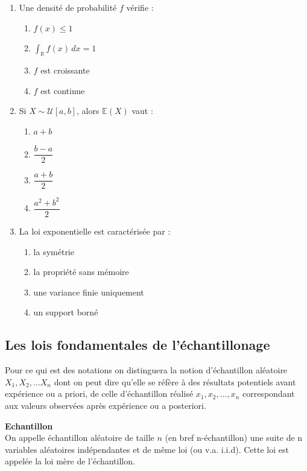 \documentclass[../PolyS4.tex]{subfiles}
\begin{document}
\begin{enumerate}
\item Une densité de probabilité $f$ vérifie :
\begin{enumerate}
\item $f(x)\le 1$
\item $\int_{\mathbb R}f(x)\,dx=1$
\item $f$ est croissante
\item $f$ est continue
\end{enumerate}

\newpage 

\item Si $X\sim\mathcal U[a,b]$, alors $\mathbb E(X)$ vaut :
\begin{enumerate}
\item $a+b$
\item $\dfrac{b-a}{2}$
\item $\dfrac{a+b}{2}$
\item $\dfrac{a^2+b^2}{2}$
\end{enumerate}

\item La loi exponentielle est caractérisée par :
\begin{enumerate}
\item la symétrie
\item la propriété sans mémoire
\item une variance finie uniquement
\item un support borné
\end{enumerate}
\end{enumerate}


\subsection{Les lois fondamentales de l'\' echantillonage}

Pour ce qui est des notations on distinguera la notion d'échantillon aléatoire $X_1,X_2,\dots X_n$ dont on peut dire qu'elle se réfère à des résultats potentiels avant expérience ou a priori, de celle d'échantillon réalisé $x_1, x_2, \dots, x_n$ correspondant aux valeurs observées après expérience ou a posteriori.\\

\begin{Def} {\textbf{Echantillon}}\\
On appelle échantillon aléatoire de taille $n$ (en bref n-échantillon) une suite de n variables aléatoires indépendantes et de même loi (ou v.a. i.i.d). Cette loi est appelée la loi mère de l'échantillon.\\
\end{Def}
\end{document}
